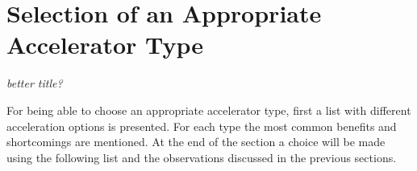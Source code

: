 \documentclass[mscthesis]{usiinfthesis}
\begin{document}
\section{Selection of an Appropriate Accelerator Type}
\label{ch:analysis_choice}

\emph{\color{red}better title?}

For being able to choose an appropriate accelerator type, first a list with
different acceleration options is presented. For each type the most common
benefits and shortcomings are mentioned. At the end of the section a choice
will be made using the following list and the observations discussed in the
previous sections.
\end{document}
